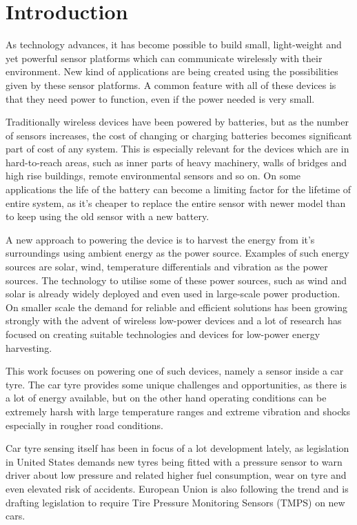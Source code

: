 \section{Introduction}

\thispagestyle{empty}

As technology advances, it has become possible to build small, light-weight and yet powerful sensor platforms which can communicate wirelessly with their environment. New kind of applications are being created using the possibilities given by these sensor platforms. A common feature with all of these devices is that they need power to function, even if the power needed is very small. 

Traditionally wireless devices have been powered by batteries, but as the number of sensors increases, the cost of changing or charging batteries becomes significant part of cost of any system. This is especially relevant for the devices which are in hard-to-reach areas, such as inner parts of heavy machinery, walls of bridges and high rise buildings, remote environmental sensors and so on. On some applications the life of the battery can become a limiting factor for the lifetime of entire system, as it's cheaper to replace the entire sensor with newer model than to keep using the old sensor with a new battery. 

A new approach to powering the device is to harvest the energy from it's surroundings using ambient energy as the power source. Examples of such energy sources are solar, wind, temperature differentials and vibration as the power sources. The technology to utilise some of these power sources, such as wind and solar is already widely deployed and even used in large-scale power production. On smaller scale the demand for reliable and efficient solutions has been growing strongly with the advent of wireless low-power devices and a lot of research has focused on creating suitable technologies and devices for low-power energy harvesting. 

This work focuses on powering one of such devices, namely a sensor inside a car tyre. The car tyre provides some unique challenges and opportunities, as there is a lot of energy available, but on the other hand operating conditions can be extremely harsh with large temperature ranges and extreme vibration and shocks especially in rougher road conditions.

Car tyre sensing itself has been in focus of a lot development lately, as legislation in United States demands new tyres being fitted with a pressure sensor to warn driver about low pressure and related higher fuel consumption, wear on tyre and even elevated risk of accidents. European Union is also following the trend and is drafting legislation to require Tire Pressure Monitoring Sensors (TMPS) on new cars. 

